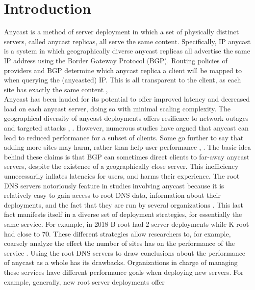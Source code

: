 \documentclass[sigconf,nonacm,10pt]{acmart}
\begin{document}
\section{Introduction}\label{introduction-1}

Anycast is a method of server deployment in which a set of physically
distinct servers, called anycast replicas, all serve the same content.
Specifically, IP anycast is a system in which geographically diverse
anycast replicas all advertise the same IP address using the Border
Gateway Protocol (BGP). Routing policies of providers and BGP determine
which anycast replica a client will be mapped to when querying the
(anycasted) IP. This is all transparent to the client, as each site has
exactly the same content \cite{rfc_1546}, \cite{katabi2000framework}.\\
Anycast has been lauded for its potential to offer improved latency and
decreased load on each anycast server, doing so with minimal scaling
complexity. The geographical diversity of anycast deployments offers
resilience to network outages and targeted attacks
\cite{li_levin_spring_bhattacharjee_2018}, \cite{moura2016anycast}.
However, numerous studies have argued that anycast can lead to reduced
performance for a subset of clients. Some go further to say that adding
more sites may harm, rather than help user performance
\cite{li_levin_spring_bhattacharjee_2018}, \cite{sarat2006use}. The
basic idea behind these claims is that BGP can sometimes direct clients
to far-away anycast servers, despite the existence of a geographically
close server. This inefficiency unnecessarily inflates latencies for
users, and harms their experience. \break
The root DNS servers notoriously feature in studies involving anycast
because it is relatively easy to gain access to root DNS data,
information about their deployments, and the fact that they are run by
several organizations \cite{root_servers}. This last fact manifests
itself in a diverse set of deployment strategies, for essentially the
same service. For example, in 2018 B-root had 2 server deployments while
K-root had close to 70. These different strategies allow researchers to,
for example, coarsely analyze the effect the number of sites has on the
performance of the service \cite{li_levin_spring_bhattacharjee_2018}.
\break
Using the root DNS servers to draw conclusions about the performance of
anycast as a whole has its drawbacks. Organizations in charge of
managing these services have different performance goals when deploying
new servers. For example, generally, new root server deployments offer
\end{document}
